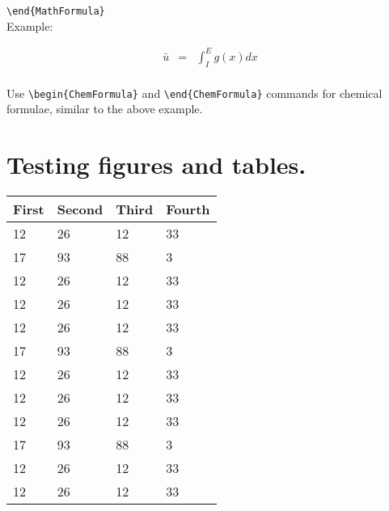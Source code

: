 \documentclass[12pt,Bold,letterpaper,TexShade]{mcgilletdclass}
\begin{document}
\begin{BulletList}
\begin{romanList}
{									\verb=\end{MathFormula}=\\
							Example:    \begin{MathFormula}
										\begin{eqnarray}
										\bar u&=& \int_{I}^E g(x)dx \nonumber \\
										\end{eqnarray}
										\end{MathFormula}
						}
			\item{Use \verb=\begin{ChemFormula}= and \verb=\end{ChemFormula}= commands for chemical formulae, similar to the above example.}

			\end{romanList}					 
		
\end{BulletList}

\section{Testing figures and tables.}
\begin{table}[htbp]
  \begin{center}
    \begin{tabular}{llll}
      \hline
      First & Second & Third & Fourth\\
      \hline
      12 & 26 & 12 & 33 \\
      17 & 93 & 88 & 3  \\
      12 & 26 & 12 & 33 \\
      12 & 26 & 12 & 33 \\
      12 & 26 & 12 & 33 \\
      17 & 93 & 88 & 3  \\
      12 & 26 & 12 & 33 \\
      12 & 26 & 12 & 33 \\
      12 & 26 & 12 & 33 \\
      17 & 93 & 88 & 3  \\
      12 & 26 & 12 & 33 \\
      12 & 26 & 12 & 33 \\
      \hline
    \end{tabular}
  \end{center}
\end{table}
\end{document}
